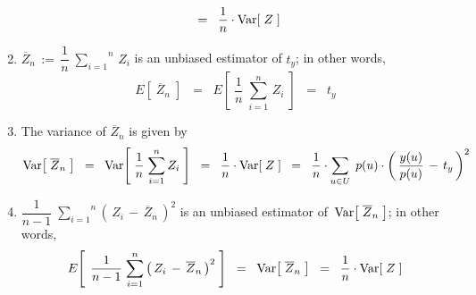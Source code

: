 \begin{theorem}
\begin{enumerate}
\begin{equation*}
	\;\; = \;\;
		\dfrac{1}{n}\cdot\textnormal{Var}\!\left[\;Z\;\right]
	\end{equation*}
\item
	$\overline{Z}_{n}\,:=\,\dfrac{1}{n}\;\overset{n}{\underset{i=1}{\sum}}\,Z_{i}$
	is an unbiased estimator of $t_{y}$;
	in other words,
	\begin{equation*}
	E\!\left[\;\overline{Z}_{n}\;\right]
	\;\; = \;\;
		E\!\left[\;\dfrac{1}{n}\;\overset{n}{\underset{i=1}{\sum}}\,Z_{i}\;\right]
	\;\; = \;\;
		t_{y}
	\end{equation*}
\item
	The variance of \;$\overline{Z}_{n}$ is given by
	\begin{equation*}
	\textnormal{Var}\!\left[\;\overline{Z}_{n}\;\right]
	\;\; = \;\;
		\textnormal{Var}\!\left[\;\dfrac{1}{n}\;\overset{n}{\underset{i=1}{\sum}}\,Z_{i}\;\right]
	\;\; = \;\;
		\dfrac{1}{n}\cdot\textnormal{Var}\!\left[\;Z\;\right]
	\;\; = \;\;
		\dfrac{1}{n} \cdot \underset{u \in U}{\sum}\;\,p(u)\cdot\left(\,\dfrac{y(u)}{p(u)}\,-\,t_{y}\,\right)^{2}
	\end{equation*}
\item
	$\dfrac{1}{n-1}\;\overset{n}{\underset{i=1}{\sum}}\left(\,Z_{i} \,-\, \overline{Z}_{n}\,\right)^{2}$\;
	is an unbiased estimator of \,$\textnormal{Var}\!\left[\;\overline{Z}_{n}\;\right]$; in other words,	
	\begin{equation*}
	E\!\left[\;\,\dfrac{1}{n-1}\;\overset{n}{\underset{i=1}{\sum}}\left(\,Z_{i} \,-\, \overline{Z}_{n}\,\right)^{2}\;\right]
	\;\; = \;\;
		\textnormal{Var}\!\left[\;\overline{Z}_{n}\;\right]
	\;\; = \;\;
		\dfrac{1}{n}\cdot\textnormal{Var}\!\left[\;Z\;\right]
	\end{equation*}
\end{enumerate}
\end{theorem}
\proof
